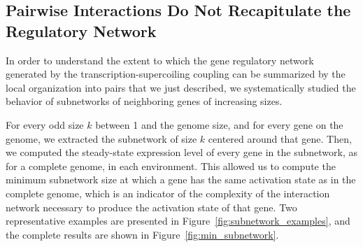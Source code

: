
\subsection{Pairwise Interactions Do Not Recapitulate the Regulatory Network}

In order to understand the extent to which the gene regulatory network generated by the transcription-supercoiling coupling can be summarized by the local organization into pairs that we just described, we systematically studied the behavior of subnetworks of neighboring genes of increasing sizes.

For every odd size $k$ between 1 and the genome size, and for every gene on the genome, we extracted the subnetwork of size $k$ centered around that gene.
Then, we computed the steady-state expression level of every gene in the subnetwork, as for a complete genome, in each environment.
This allowed us to compute the minimum subnetwork size at which a gene has the same activation state as in the complete genome, which is an indicator of the complexity of the interaction network necessary to produce the activation state of that gene.
Two representative examples are presented in Figure~\ref{fig:subnetwork_examples}, and the complete results are shown in Figure~\ref{fig:min_subnetwork}.


